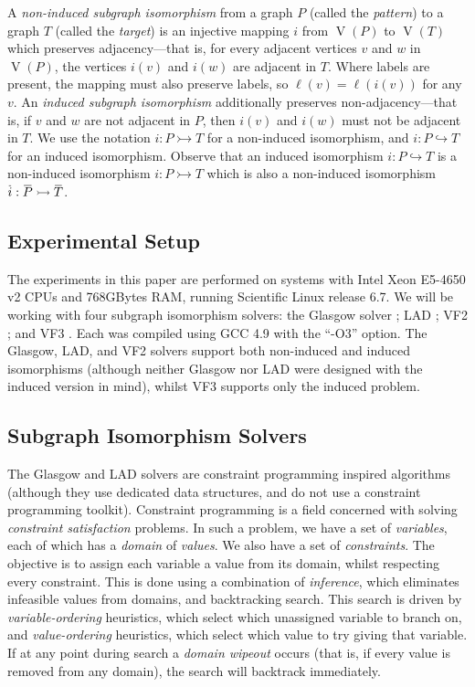 \documentclass[twoside,11pt]{article}
\newcommand{\citep}[1]{\cite{#1}}
\newcommand{\shortoverline}[1]{\mkern 1.5mu\overline{\mkern-1.5mu#1\mkern-1.5mu}\mkern 1.5mu}
\begin{document}
A \emph{non-induced subgraph isomorphism} from a graph $P$ (called the \emph{pattern}) to a graph
$T$ (called the \emph{target}) is an injective mapping $i$ from $\operatorname{V}(P)$ to
$\operatorname{V}(T)$ which preserves adjacency---that is, for every adjacent vertices $v$ and $w$ in
$\operatorname{V}(P)$, the vertices $i(v)$ and $i(w)$ are adjacent in $T$. Where labels are present,
the mapping must also preserve labels, so $\ell(v) = \ell(i(v))$ for any $v$. An \emph{induced
subgraph isomorphism} additionally preserves non-adjacency---that is, if $v$ and $w$ are not
adjacent in $P$, then $i(v)$ and $i(w)$ must not be adjacent in $T$. We use the notation $i : P
\rightarrowtail T$ for a non-induced isomorphism, and $i : P \hookrightarrow T$ for an induced
isomorphism. Observe that an induced isomorphism $i : P \hookrightarrow T$ is a non-induced
isomorphism $i : P \rightarrowtail T$ which is also a non-induced isomorphism $\shortoverline{i} :
\shortoverline{P} \rightarrowtail \shortoverline{T}$.

\subsection{Experimental Setup}

The experiments in this paper are performed on systems with Intel Xeon E5-4650 v2 CPUs and 768GBytes
RAM, running Scientific Linux release 6.7. We will be working with four subgraph isomorphism
solvers: the Glasgow solver \citep{DBLP:conf/cp/McCreeshP15,DBLP:conf/lion/KotthoffMS16}; LAD
\citep{DBLP:journals/ai/Solnon10}; VF2 \citep{DBLP:journals/pami/CordellaFSV04}; and VF3
\citep{DBLP:conf/gbrpr/CarlettiFSV17}. Each was compiled using GCC 4.9 with the ``-O3'' option.
The Glasgow, LAD, and VF2 solvers support both non-induced and induced isomorphisms (although
neither Glasgow nor LAD were designed with the induced version in mind), whilst VF3 supports only
the induced problem.

\subsection{Subgraph Isomorphism Solvers}

The Glasgow and LAD solvers are constraint programming inspired algorithms (although they use
dedicated data structures, and do not use a constraint programming toolkit). Constraint programming
is a field concerned with solving \emph{constraint satisfaction} problems. In such a problem, we
have a set of \emph{variables}, each of which has a \emph{domain} of \emph{values}. We also have a
set of \emph{constraints}. The objective is to assign each variable a value from its domain, whilst
respecting every constraint. This is done using a combination of \emph{inference}, which eliminates
infeasible values from domains, and backtracking search. This search is driven by
\emph{variable-ordering} heuristics, which select which unassigned variable to branch on, and
\emph{value-ordering} heuristics, which select which value to try giving that variable. If at any
point during search a \emph{domain wipeout} occurs (that is, if every value is removed from any
domain), the search will backtrack immediately.
\end{document}
